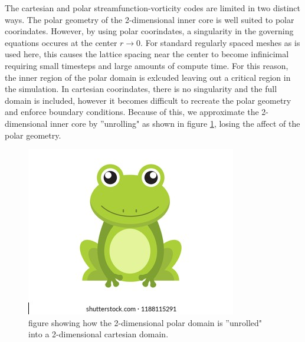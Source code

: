\documentclass{article}
\begin{document}
The cartesian and polar streamfunction-vorticity codes are limited in two 
distinct ways. The polar geometry of the 2-dimensional inner core is well 
suited to polar coorindates. However, by using polar coorindates, a 
singularity in the governing equations occures at the center 
$r \rightarrow 0$. For standard regularly spaced meshes as is used here, 
this causes the lattice spacing near the center to become infinicimal 
requiring small timesteps and large amounts of compute time. For this 
reason, the inner region of the polar domain is exlcuded leaving out a 
critical region in the simulation. In cartesian coorindates, there is no 
singularity and the full domain is included, however it becomes difficult 
to recreate the polar geometry and enforce boundary conditions. Because of 
this, we approximate the 2-dimensional inner core by ''unrolling" as shown 
in figure \ref{unrolling}, losing the affect of the polar geometry. 


\begin{figure}[h!]
	\centering
	\includegraphics{frog.png}
	\caption{figure showing how the 2-dimensional polar domain is ''unrolled" into a 2-dimensional cartesian domain.}
	\label{unrolling}
\end{figure}
\end{document}
